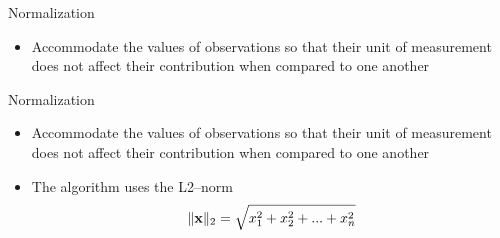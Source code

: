 \begin{frame}{Normalization}
    \begin{itemize}
        \item Accommodate the values of observations so that their unit of measurement does not affect their contribution when compared to one another
    \end{itemize}
\end{frame}

\begin{frame}{Normalization}
    \begin{itemize}
        \item Accommodate the values of observations so that their unit of measurement does not affect their contribution when compared to one another
        \item The \mlblink algorithm uses the L2--norm 
            \begin{equation} \label{eq:l2-norm}
                \lVert \boldsymbol{\mathbf{x}} \rVert_{2} = \sqrt{x^2_1 + x^2_2 + ... + x^2_n}
            \end{equation}
    \end{itemize}
\end{frame}
